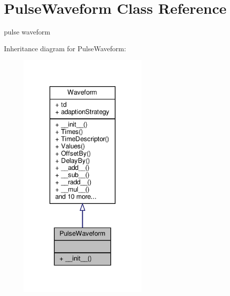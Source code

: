 \hypertarget{classSignalIntegrity_1_1TimeDomain_1_1Waveform_1_1PulseWaveform_1_1PulseWaveform}{}\section{Pulse\+Waveform Class Reference}
\label{classSignalIntegrity_1_1TimeDomain_1_1Waveform_1_1PulseWaveform_1_1PulseWaveform}


pulse waveform  




Inheritance diagram for Pulse\+Waveform\+:
\nopagebreak
\begin{figure}[H]
\begin{center}
\leavevmode
\includegraphics[width=179pt]{classSignalIntegrity_1_1TimeDomain_1_1Waveform_1_1PulseWaveform_1_1PulseWaveform__inherit__graph}
\end{center}
\end{figure}


